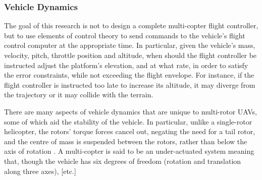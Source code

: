




\subsubsection{Vehicle Dynamics}

The goal of this research is not to design a complete multi-copter flight controller, but to use elements of control theory to send commands to the vehicle's flight control computer at the appropriate time. In particular, given the vehicle's mass, velocity, pitch, throttle position and altitude, when should the flight controller be instructed adjust the platform's elevation, and at what rate, in order to satisfy the error constraints, while not exceeding the flight envelope. For instance, if the flight controller is instructed too late to increase its altitude, it may diverge from the trajectory or it may collide with the terrain.

There are many aspects of vehicle dynamics that are unique to multi-rotor UAVs, some of which aid the stability of the vehicle. In particular, unlike a single-rotor helicopter, the rotors' torque forces cancel out, negating the need for a tail rotor, and the centre of mass is suspended between the rotors, rather than below the axis of rotation \cite{McKerrow2004}. A multi-copter is said to be an under-actuated system \cite{McKerrow2004,Mian2008,Valavanis2007} meaning that, though the vehicle has six degrees of freedom (rotation and translation along three axes), [etc.]

